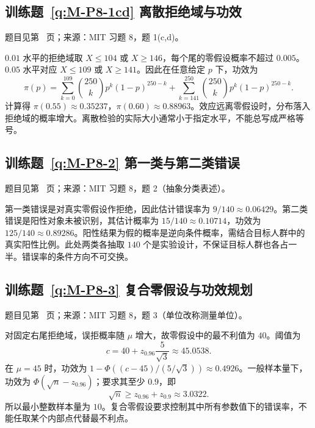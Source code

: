 \subsection*{训练题~\ref{q:M-P8-1cd} 离散拒绝域与功效}\label{a:M-P8-1cd}{\small 题目见第~\pageref{q:M-P8-1cd} 页；来源：MIT 习题 8，题 1(c,d)。}
\begin{solve}$0.01$ 水平的拒绝域取 $X\le104$ 或 $X\ge146$，每个尾的零假设概率不超过 $0.005$。$0.05$ 水平对应 $X\le109$ 或 $X\ge141$。因此在任意给定 $p$ 下，功效为\[\pi(p)=\sum_{k=0}^{109}\binom{250}{k}p^k(1-p)^{250-k}+\sum_{k=141}^{250}\binom{250}{k}p^k(1-p)^{250-k}.\]计算得 $\pi(0.55)\approx0.35237$，$\pi(0.60)\approx0.88963$。效应远离零假设时，分布落入拒绝域的概率增大。离散检验的实际大小通常小于指定水平，不能总写成严格等号。\end{solve}

\subsection*{训练题~\ref{q:M-P8-2} 第一类与第二类错误}\label{a:M-P8-2}{\small 题目见第~\pageref{q:M-P8-2} 页；来源：MIT 习题 8，题 2（抽象分类表述）。}
\begin{solve}第一类错误是对真实零假设作拒绝，因此估计错误率为 $9/140\approx0.06429$。第二类错误是阳性对象未被识别，其估计概率为 $15/140\approx0.10714$，功效为 $125/140\approx0.89286$。阳性结果为假的概率是逆向条件概率，需结合目标人群中的真实阳性比例。此处两类各抽取 $140$ 个是实验设计，不保证目标人群也各占一半。错误率的条件方向不可交换。\end{solve}

\subsection*{训练题~\ref{q:M-P8-3} 复合零假设与功效规划}\label{a:M-P8-3}{\small 题目见第~\pageref{q:M-P8-3} 页；来源：MIT 习题 8，题 3（单位改称测量单位）。}
\begin{solve}对固定右尾拒绝域，误拒概率随 $\mu$ 增大，故零假设中的最不利值为 $40$。阈值为\[c=40+z_{0.96}\frac5{\sqrt3}\approx45.0538.\]在 $\mu=45$ 时，功效为 $1-\Phi((c-45)/(5/\sqrt3))\approx0.4926$。一般样本量下，功效为 $\Phi(\sqrt n-z_{0.96})$；要求其至少 $0.9$，即\[\sqrt n\ge z_{0.96}+z_{0.9}\approx3.0322.\]所以最小整数样本量为 $10$。复合零假设要求控制其中所有参数值下的错误率，不能任取某个内部点代替最不利点。\end{solve}

